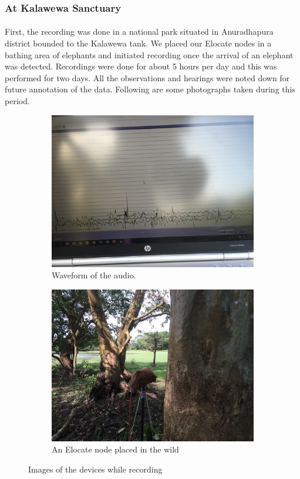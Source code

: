 \documentclass[12pt]{article}
\numberwithin{figure}{section}
\numberwithin{table}{section}
\begin{document}
\subsubsection{At Kalawewa Sanctuary }
\paragraph{}
First, the recording was done in a national park situated in Anuradhapura district bounded to the Kalawewa tank. We placed our Elocate nodes in a bathing area of elephants and initiated recording once the arrival of an elephant was detected. Recordings were done for about 5 hours per day and this was performed for two days. All the observations and hearings were noted down for future annotation of the data. Following are some photographs taken during this period. 
 
\begin{figure}[H]
\centering
\begin{subfigure}{.5\textwidth}
  \centering
  \includegraphics[width=.8\linewidth]{Kalawewa1.jpg}
  \caption{Waveform of the audio.}
  \label{fig:sub1}
\end{subfigure}%
\begin{subfigure}{.5\textwidth}
  \centering
  \includegraphics[width=.8\linewidth]{Kalawewa2.jpg}
  \caption{An Elocate node placed in the wild}
  \label{fig:sub2}
\end{subfigure}
\caption{Images of the devices while recording}
\label{fig:test}
\end{figure} 
\end{document}
